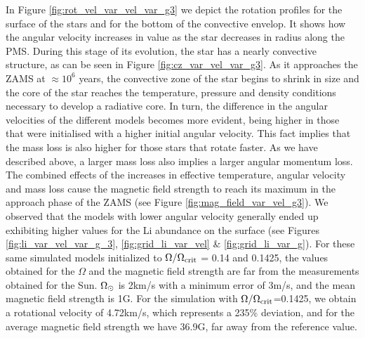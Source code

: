 \documentclass[fleqn,usenatbib]{mnras}
\begin{document}
In Figure \ref{fig:rot_vel_var_vel_var_g3} we depict the rotation profiles for the surface of the stars and for the bottom of the convective envelop. It shows how the angular velocity increases in value as the star decreases in radius along the PMS. During this stage of its evolution, the star has a nearly convective structure, as can be seen in Figure \ref{fig:cz_var_vel_var_g3}. As it approaches the ZAMS at $\approx 10^6$ years, the convective zone of the star begins to shrink in size and the core of the star reaches the temperature, pressure and density conditions necessary to develop a radiative core. In turn, the difference in the angular velocities of the different models becomes more evident, being higher in those that were initialised with a higher initial angular velocity. This fact implies that the mass loss is also higher for those stars that rotate faster. As we have described above, a larger mass loss also implies a larger angular momentum loss. The combined effects of the increases in effective temperature, angular velocity and mass loss cause the magnetic field strength to reach its maximum in the approach phase of the ZAMS (see Figure \ref{fig:mag_field_var_vel_g3}). We observed that the models with lower angular velocity generally ended up exhibiting higher values for the Li abundance on the surface (see Figures~ \ref{fig:li_var_vel_var_g_3}, \ref{fig:grid_li_var_vel} \& \ref{fig:grid_li_var_g}). For these same simulated models initialized to $\Omega / \Omega_{\mathrm{crit}}$ = 0.14 and 0.1425, the values obtained for the $\Omega$ and the magnetic field strength are far from the measurements obtained for the Sun. $\Omega_\odot$ is 2km/s with a minimum error of 3m/s, and the mean magnetic field strength is 1G. For the simulation with $\Omega / \Omega_{\mathrm{crit}}$=0.1425, we obtain a rotational velocity of 4.72km/s, which represents a 235\% deviation, and for the average magnetic field strength we have 36.9G, far away from the reference value.\par
\end{document}
